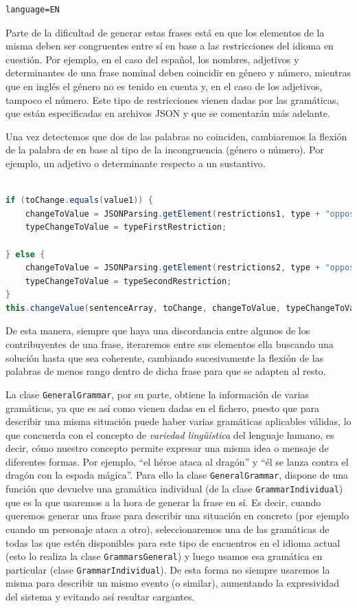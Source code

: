 \begin{verbatim}
language=EN
\end{verbatim}

\noindent Parte de la dificultad de generar estas frases está en que los elementos de la misma deben ser congruentes entre sí en base a las restricciones del idioma en cuestión. Por ejemplo, en el caso del español, los nombres, adjetivos y determinantes de una frase nominal deben coincidir en género y número, mientras que en inglés el género no es tenido en cuenta y, en el caso de los adjetivos, tampoco el número. Este tipo de restricciones vienen dadas por las gramáticas, que están especificadas en archivos JSON y que se comentarán más adelante.

Una vez detectemos que dos de las palabras no coinciden, cambiaremos la flexión de la palabra de en base al tipo de la incongruencia (género o número). Por ejemplo, un adjetivo o determinante respecto a un sustantivo.

\begin{lstlisting}[language=java]

if (toChange.equals(value1)) {
    changeToValue = JSONParsing.getElement(restrictions1, type + "opposite");
    typeChangeToValue = typeFirstRestriction; 
     
} else {
    changeToValue = JSONParsing.getElement(restrictions2, type + "opposite");
    typeChangeToValue = typeSecondRestriction;
}
this.changeValue(sentenceArray, toChange, changeToValue, typeChangeToValue);

\end{lstlisting}

\noindent De esta manera, siempre que haya una discordancia entre algunos de los contribuyentes de una frase, iteraremos entre sus elementos ella buscando una solución hasta que sea coherente, cambiando sucesivamente la flexión de las palabras de menos rango dentro de dicha frase para que se adapten al resto.

La clase \texttt{GeneralGrammar}, por su parte, obtiene la información de varias gramáticas, ya que es así como vienen dadas en el fichero, puesto que para describir una misma situación puede haber varias gramáticas aplicables válidas, lo que concuerda con el concepto de \emph{variedad lingüística} del lenguaje humano, es decir, cómo nuestro concepto permite expresar una misma idea o mensaje de diferentes formas. Por ejemplo, ``el héroe ataca al dragón'' y ``él se lanza contra el dragón con la espada mágica''. 
Para ello la clase \texttt{GeneralGrammar}, dispone de una función que devuelve una gramática individual (de la clase \texttt{GrammarIndividual}) que es la que usaremos a la hora de generar la frase en sí. Es decir, cuando queremos generar una frase para describir una situación en concreto (por ejemplo cuando un personaje ataca a otro), seleccionaremos una de las gramáticas de todas las que estén disponibles para este tipo de encuentros en el idioma actual (esto lo realiza la clase \texttt{GrammarsGeneral}) y luego usamos esa gramática en particular (clase \texttt{GrammarIndividual}). De esta forma no siempre usaremos la misma para describir un mismo evento (o similar), aumentando la expresividad del sistema y evitando así resultar cargantes.

